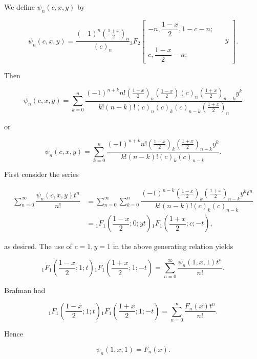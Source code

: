 \begin{solution}
We define $\psi_n(c,x,y)$ by

$$\psi_n(c,x,y) = \dfrac{(-1)^n (\frac{1+x}{2})_n}{(c)_n} {}_3F_2 \left[ \begin{array}{rlr}
-n, \dfrac{1-x}{2}, 1-c-n; & & \\
& & y \\
c, \dfrac{1-x}{2}-n; & &
\end{array} \right].$$

Then

$$\psi_n(c,x,y) = \displaystyle\sum_{k=0}^n \dfrac{(-1)^{n+k} n! (\frac{1+x}{2})_n (\frac{1-x}{2}) (c)_n (\frac{1+x}{2})_{n-k} y^k}{k! (n-k)! (c)_n (c)_k (c)_{n-k} (\frac{1+x}{2})_n}$$

or

$$\psi_n(c,x,y) = \displaystyle\sum_{k=0}^n \dfrac{(-1)^{n+k} n! (\frac{1-x}{2})_k (\frac{1+x}{2})_{n-k} y^k}{k! (n-k)! (c)_k (c)_{n-k}}.$$

First consider the series

$$\begin{array}{ll}
\displaystyle\sum_{n=0}^{\infty} \dfrac{\psi_n(c,x,y)t^n}{n!} &= \displaystyle\sum_{n=0}^{\infty} \displaystyle\sum_{k=0}^n \dfrac{(-1)^{n-k} (\frac{1-x}{2})_k (\frac{1+x}{2})_{n-k} y^k t^n}{k! (n-k)! (c)_k (c)_{n-k}} \\
&= {}_1F_1 \left( \dfrac{1-x}{2}; 0 ; yt \right) {}_1F_1 \left( \dfrac{1+x}{2}; c; -t \right),
\end{array}$$

as desired. The use of $c=1,y=1$ in the above generating relation yields

$${}_1F_1 \left( \dfrac{1-x}{2};1;t \right) {}_1F_1 \left( \dfrac{1+x}{2}; 1 ; -t \right) = \displaystyle\sum_{n=0}^{\infty} \dfrac{\psi_n(1,x,1) t^n}{n!}.$$

Brafman had

$${}_1F_1 \left( \dfrac{1-x}{2};1;t \right) {}_1F_1 \left( \dfrac{1+x}{2};1;-t \right) = \displaystyle\sum_{n=0}^{\infty} \dfrac{F_n(x) t^n}{n!}.$$

Hence

$$\psi_n(1,x,1) = F_n(x).$$


\end{solution}
